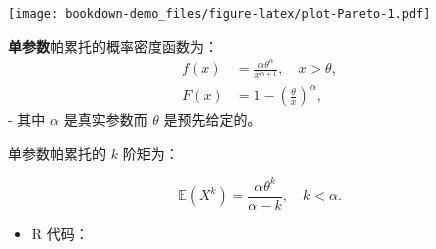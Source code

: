 \documentclass[
]{book}
\providecommand{\tightlist}{%
  \setlength{\itemsep}{0pt}\setlength{\parskip}{0pt}}
\begin{document}
\texttt{[image: bookdown-demo\_files/figure-latex/plot-Pareto-1.pdf]}

\textbf{单参数}帕累托的概率密度函数为：
\[
\begin{align*}
f(x)&=\frac{\alpha\theta^\alpha}{x^{\alpha+1}},\quad x>\theta,\\
F(x)&=1-\left(\frac{\theta}{x}\right)^\alpha,
\end{align*}
\]
- 其中 \(\alpha\) 是真实参数而 \(\theta\) 是预先给定的。

单参数帕累托的 \(k\) 阶矩为：

\[
\mathbb{E}(X^k)=\frac{\alpha \theta^k}{\alpha-k},\quad k < \alpha.
\]

\begin{itemize}
\tightlist
\item
  R 代码：
\end{itemize}
\end{document}
